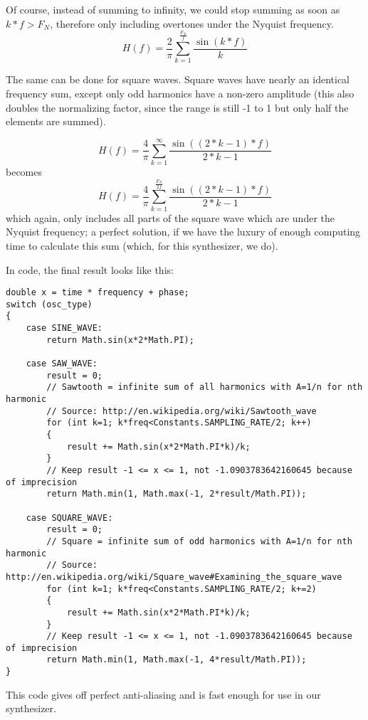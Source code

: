 \documentclass[11pt,a4paper]{article}
\begin{document}
Of course, instead of summing to infinity, we could stop summing as soon as \(k*f > F_N\), therefore only including overtones under the Nyquist frequency.
\begin{equation}
H(f) = \frac{2}{\pi}\sum\limits_{k=1}^\frac{F_N}{f}{\frac{\sin(k*f)}{k}}
\end{equation}

The same can be done for square waves. Square waves have nearly an identical frequency sum, except only odd harmonics have a non-zero amplitude (this also doubles the normalizing factor, since the range is still -1 to 1 but only half the elements are summed).

\begin{equation}
H(f) = \frac{4}{\pi}\sum\limits_{k=1}^\infty{\frac{\sin((2*k-1)*f)}{2*k-1}}
\end{equation}
becomes
\begin{equation}
H(f) = \frac{4}{\pi}\sum\limits_{k=1}^\frac{F_N}{2f}{\frac{\sin((2*k-1)*f)}{2*k-1}}
\end{equation}
which again, only includes all parts of the square wave which are under the Nyquist frequency; a perfect solution, if we have the luxury of enough computing time to calculate this sum (which, for this synthesizer, we do).

In code, the final result looks like this:
\\\begin{minipage}{\linewidth}
\begin{lstlisting}
double x = time * frequency + phase;
switch (osc_type)
{
	case SINE_WAVE:
		return Math.sin(x*2*Math.PI);
	
	case SAW_WAVE:
		result = 0;
		// Sawtooth = infinite sum of all harmonics with A=1/n for nth harmonic
		// Source: http://en.wikipedia.org/wiki/Sawtooth_wave
		for (int k=1; k*freq<Constants.SAMPLING_RATE/2; k++)
		{
			result += Math.sin(x*2*Math.PI*k)/k;
		}
		// Keep result -1 <= x <= 1, not -1.0903783642160645 because of imprecision
		return Math.min(1, Math.max(-1, 2*result/Math.PI));
		
	case SQUARE_WAVE:
		result = 0;
		// Square = infinite sum of odd harmonics with A=1/n for nth harmonic
		// Source: http://en.wikipedia.org/wiki/Square_wave#Examining_the_square_wave
		for (int k=1; k*freq<Constants.SAMPLING_RATE/2; k+=2)
		{
			result += Math.sin(x*2*Math.PI*k)/k;
		}
		// Keep result -1 <= x <= 1, not -1.0903783642160645 because of imprecision
		return Math.min(1, Math.max(-1, 4*result/Math.PI));
}
\end{lstlisting}
\end{minipage}
This code gives off perfect anti-aliasing and is fast enough for use in our synthesizer.
\end{document}
